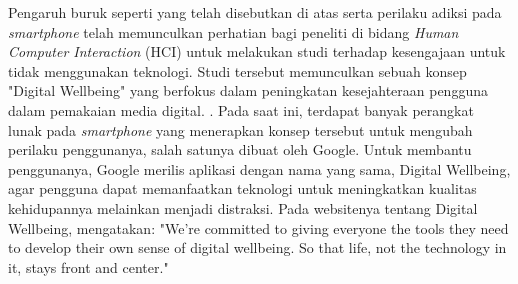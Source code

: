 Pengaruh buruk seperti yang telah disebutkan di atas serta perilaku adiksi pada \textit{smartphone} telah memunculkan perhatian bagi peneliti di bidang \textit{Human Computer Interaction} (HCI) untuk melakukan studi terhadap kesengajaan untuk tidak menggunakan teknologi. Studi tersebut memunculkan sebuah konsep "Digital Wellbeing" yang berfokus dalam peningkatan kesejahteraan pengguna dalam pemakaian media digital. \parencite{unesco2015dwconference}. Pada saat ini, terdapat banyak perangkat lunak pada \textit{smartphone} yang menerapkan konsep tersebut untuk mengubah perilaku penggunanya, salah satunya dibuat oleh Google. \parencite{CHI2019SOCIALIZE} Untuk membantu penggunanya, Google merilis aplikasi dengan nama yang sama, Digital Wellbeing, agar pengguna dapat memanfaatkan teknologi untuk meningkatkan kualitas kehidupannya melainkan menjadi distraksi. Pada websitenya tentang Digital Wellbeing, \textcite{google2019digitalwellbeing} mengatakan: "We’re committed to giving everyone the tools they need to develop their own sense of digital wellbeing. So that life, not the technology in it, stays front and center." 



